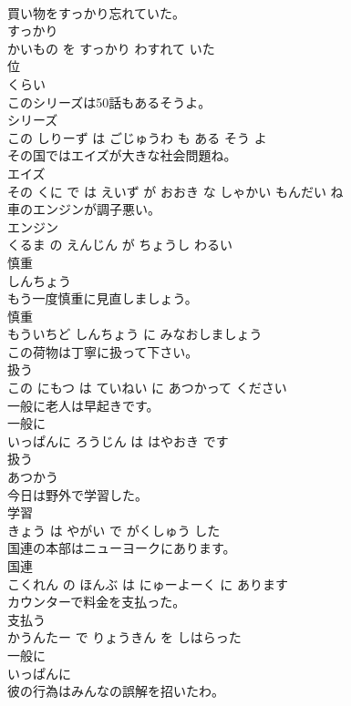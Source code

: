 \documentclass[8pt]{extreport}
\begin{document}
\begin{CJK}{UTF8}{min}
\\	買い物をすっかり忘れていた。	
\\	すっかり 
\\	かいもの を すっかり わすれて いた			
\\	位	
\\	くらい			
\\	このシリーズは50話もあるそうよ。	
\\	シリーズ 
\\	この しりーず は ごじゅうわ も ある そう よ			
\\	その国ではエイズが大きな社会問題ね。	
\\	エイズ 
\\	その くに で は えいず が おおき な しゃかい もんだい ね			
\\	車のエンジンが調子悪い。	
\\	エンジン 
\\	くるま の えんじん が ちょうし わるい			
\\	慎重	
\\	しんちょう			
\\	もう一度慎重に見直しましょう。	
\\	慎重 
\\	もういちど しんちょう に みなおしましょう			
\\	この荷物は丁寧に扱って下さい。	
\\	扱う 
\\	この にもつ は ていねい に あつかって ください			
\\	一般に老人は早起きです。	
\\	一般に 
\\	いっぱんに ろうじん は はやおき です			
\\	扱う	
\\	あつかう			
\\	今日は野外で学習した。	
\\	学習 
\\	きょう は やがい で がくしゅう した			
\\	国連の本部はニューヨークにあります。	
\\	国連 
\\	こくれん の ほんぶ は にゅーよーく に あります			
\\	カウンターで料金を支払った。	
\\	支払う 
\\	かうんたー で りょうきん を しはらった			
\\	一般に	
\\	いっぱんに			
\\	彼の行為はみんなの誤解を招いたわ。	

\end{CJK}
\end{document}
